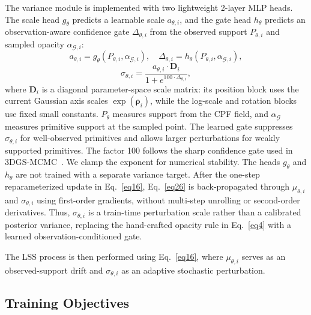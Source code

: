 \documentclass[lettersize,journal]{IEEEtran}
\begin{document}
The variance module is implemented with two lightweight 2-layer MLP heads. The scale head $g_{\theta}$ predicts a learnable scale $a_{\theta,i}$, and the gate head $h_{\theta}$ predicts an observation-aware confidence gate $\Delta_{\theta,i}$ from the observed support $P_{\theta,i}$ and sampled opacity $\alpha_{\mathcal{G},i}$:
\begin{equation}
    a_{\theta,i} = g_{\theta}\left(P_{\theta,i}, \alpha_{\mathcal{G},i}\right),\quad 
    \Delta_{\theta,i} = h_{\theta}\left(P_{\theta,i}, \alpha_{\mathcal{G},i}\right),
    \label{eq25.01}    
\end{equation}
\begin{equation}
    {\sigma}_{\theta,i} = \frac{a_{\theta,i} \cdot \mathbf{D}_i}{1 + e^{100 \cdot \Delta_{\theta,i}}}, 
    \label{eq25}
\end{equation}
where $\mathbf{D}_i$ is a diagonal parameter-space scale matrix: its position block uses the current Gaussian axis scales $\exp(\boldsymbol{\rho}_i)$, while the log-scale and rotation blocks use fixed small constants. $P_{\theta}$ measures support from the CPF field, and $\alpha_{\mathcal{G}}$ measures primitive support at the sampled point.
The learned gate suppresses ${\sigma}_{\theta,i}$ for well-observed primitives and allows larger perturbations for weakly supported primitives. The factor 100 follows the sharp confidence gate used in 3DGS-MCMC~\cite{mcmc}. We clamp the exponent for numerical stability. The heads $g_{\theta}$ and $h_{\theta}$ are not trained with a separate variance target. After the one-step reparameterized update in Eq.~\ref{eq16}, Eq.~\ref{eq26} is back-propagated through $\mu_{\theta,i}$ and $\sigma_{\theta,i}$ using first-order gradients, without multi-step unrolling or second-order derivatives. Thus, ${\sigma}_{\theta,i}$ is a train-time perturbation scale rather than a calibrated posterior variance, replacing the hand-crafted opacity rule in Eq.~\ref{eq4} with a learned observation-conditioned gate.

The LSS process is then performed using Eq.~\ref{eq16}, where ${\mu}_{\theta,i}$ serves as an observed-support drift and ${\sigma}_{\theta,i}$ as an adaptive stochastic perturbation.  

\subsection{Training Objectives}
\end{document}
